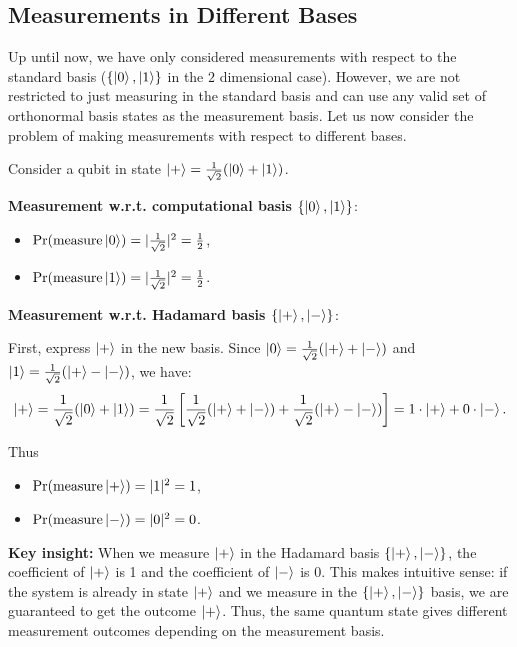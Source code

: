 \subsection{Measurements in Different Bases}
Up until now, we have only considered measurements with respect to the standard basis ($\{ \ket{0}, \ket{1} \}$ in the $2$ dimensional case). However, we are not restricted to just measuring in the standard basis and can use any valid set of orthonormal basis states as the measurement basis. Let us now consider the problem of making measurements with respect to different bases.
\begin{example}
Consider a qubit in state $\ket{+} = \frac{1}{\sqrt{2}}(\ket{0} + \ket{1})$.

\textbf{Measurement w.r.t. computational basis $\{\ket{0}, \ket{1}\}$}:
\begin{itemize}
\item $\operatorname{Pr}(\text{measure} \ket{0}) = |\frac{1}{\sqrt{2}}|^2 = \frac{1}{2}$,
\item $\operatorname{Pr}(\text{measure} \ket{1}) = |\frac{1}{\sqrt{2}}|^2 = \frac{1}{2}$.
\end{itemize}

\textbf{Measurement w.r.t. Hadamard basis $\{\ket{+}, \ket{-}\}$}:

First, express $\ket{+}$ in the new basis. Since $\ket{0} = \frac{1}{\sqrt{2}}(\ket{+} + \ket{-})$ and $\ket{1} = \frac{1}{\sqrt{2}}(\ket{+} - \ket{-})$, we have:
$$\ket{+} = \frac{1}{\sqrt{2}}(\ket{0} + \ket{1}) = \frac{1}{\sqrt{2}}\left[\frac{1}{\sqrt{2}}(\ket{+} + \ket{-}) + \frac{1}{\sqrt{2}}(\ket{+} - \ket{-})\right] = 1 \cdot \ket{+} + 0 \cdot \ket{-}.$$

Thus
\begin{itemize}
\item $\operatorname{Pr}(\text{measure} \ket{+}) = |1|^2 = 1$,
\item $\operatorname{Pr}(\text{measure} \ket{-}) = |0|^2 = 0$.
\end{itemize}

\textbf{Key insight:} When we measure $\ket{+}$ in the Hadamard basis $\{\ket{+}, \ket{-}\}$, the coefficient of $\ket{+}$ is 1 and the coefficient of $\ket{-}$ is 0. This makes intuitive sense: if the system is already in state $\ket{+}$ and we measure in the $\{\ket{+}, \ket{-}\}$ basis, we are guaranteed to get the outcome $\ket{+}$. Thus, the same quantum state gives different measurement outcomes depending on the measurement basis.
\end{example}

